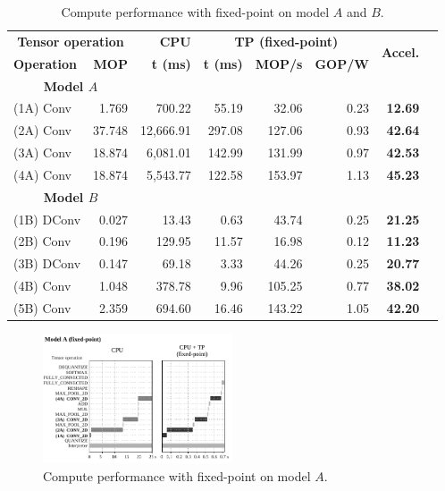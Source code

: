 \begin{table}[!htp]\centering
	\caption{Compute performance with fixed-point on model $A$ and $B$.}\label{tab:performance_fixed_point}
	\scriptsize
\begin{tabular}{lrrrrrrr}\toprule
	\multicolumn{2}{c}{\textbf{Tensor operation}} &\textbf{CPU} &\multicolumn{3}{c}{\textbf{TP (fixed-point)}} &\multirow{2}{*}{\textbf{Accel.}} \\\cmidrule{1-6}
	\textbf{Operation} &\textbf{MOP} &\textbf{t (ms)} &\textbf{t (ms)} &\textbf{MOP/s} &\textbf{GOP/W} & \\\midrule
	\multicolumn{2}{c}{\textbf{Model $A$}} & & & & & \\
	(1A) Conv &1.769 &700.22 &55.19 &32.06 &0.23 &\textbf{12.69} \\
	(2A) Conv &37.748 &12,666.91 &297.08 &127.06 &0.93 &\textbf{42.64} \\
	(3A) Conv &18.874 &6,081.01 &142.99 &131.99 &0.97 &\textbf{42.53} \\
	(4A) Conv &18.874 &5,543.77 &122.58 &153.97 &1.13 &\textbf{45.23} & \\\midrule
	\multicolumn{2}{c}{\textbf{Model $B$}} & & & & & \\
	(1B) DConv &0.027 &13.43 &0.63 &43.74 &0.25 &\textbf{21.25} \\
	(2B) Conv &0.196 &129.95 &11.57 &16.98 &0.12 &\textbf{11.23} \\
	(3B) DConv &0.147 &69.18 &3.33 &44.26 &0.25 &\textbf{20.77} \\
	(4B) Conv &1.048 &378.78 &9.96 &105.25 &0.77 &\textbf{38.02} \\
	(5B) Conv &2.359 &694.60 &16.46 &143.22 &1.05 &\textbf{42.20} \\
	\bottomrule
\end{tabular}
\end{table}

\begin{figure}[t!]
	\centering
	\includegraphics[width=0.5\textwidth]{../figures/sched_A_fixed_point.pdf}
	\caption{Compute performance with fixed-point on model $A$.}
	\label{fig:sched_model_a_fixed}
\end{figure}


